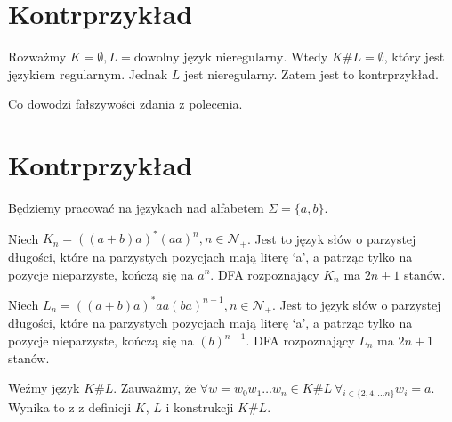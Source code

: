 \documentclass{article}
\theoremstyle{definition}
\theoremstyle{remark}
\begin{document}
\section{Kontrprzykład}

Rozważmy \(K = \emptyset, L = \text{dowolny język nieregularny}\). Wtedy \(K \#
L = \emptyset\), który jest językiem regularnym. Jednak \(L\) jest
nieregularny. Zatem jest to kontrprzykład.

Co dowodzi fałszywości zdania z polecenia.

\section{Kontrprzykład}

Będziemy pracować na językach nad alfabetem \(\Sigma = \{a, b\}\).

Niech \(K_n = ( (a+b)a )^* (aa)^n, n \in \mathcal{N_+}\). Jest to język słów o
parzystej długości, które na parzystych pozycjach mają literę `a', a patrząc
tylko na pozycje nieparzyste, kończą się na \(a^n\). DFA rozpoznający \(K_n\)
ma \(2n+1\) stanów.





Niech \(L_n = ( (a+b)a )^* aa (ba)^{n-1}, n \in \mathcal{N_+}\). Jest to język
słów o parzystej długości, które na parzystych pozycjach mają literę `a', a
patrząc tylko na pozycje nieparzyste, kończą się na \( (b)^{n-1}\). DFA
rozpoznający \(L_n\) ma \(2n+1\) stanów.

Weźmy język \(K \# L\). Zauważmy, że \( \forall w= w_0 w_1 \ldots w_n \in K \#
L \ \forall_{i \in \{ 2, 4, \ldots n \} } w_i = a\). Wynika to z z definicji
\(K\), \(L\) i konstrukcji \(K \# L\).
\end{document}
